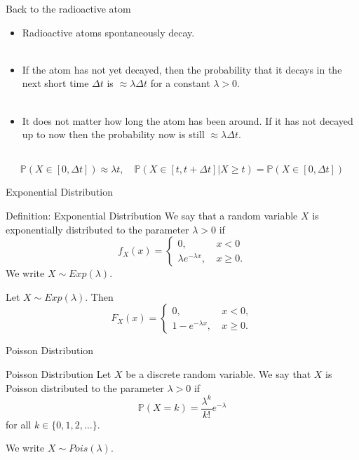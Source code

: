 \documentclass[11pt,pdf,ngerman,UKenglish]{beamer}%
\newcommand{\IP}{\mathbb{P}}
\newcommand{\1}{\mathbb{1}}
\theoremstyle{thm}
\theoremstyle{def}
\begin{document}
\begin{frame}{Back to the radioactive atom}
\begin{itemize}
\item Radioactive atoms spontaneously decay.
\\ \
\item If the atom has not yet decayed, then the probability that it decays in the next short time $\Delta t$ is $\approx \lambda \Delta t$ for a constant $\lambda >0$.
\\ \
\item It does not matter how long the atom has been around. If it has not decayed up to now then the probability now is still $\approx \lambda \Delta t$.
\end{itemize}
\ \\
\pause
$$ \IP( X \in [ 0, \Delta t]) \approx \lambda t
, \quad 
\IP(X \in [t, t + \Delta t] \vert X \geq t ) = \IP( X \in [0,\Delta t])$$
\end{frame}


\begin{frame}{Exponential Distribution}
\begin{block}{Definition: Exponential Distribution}
We say that a random variable $X$ is exponentially distributed to the parameter $\lambda > 0$ if
$$ f_X(x) = \begin{cases} 0, & \ x < 0 \\ \lambda e^{- \lambda x}, & \ x \geq 0. \end{cases}$$
We write $X \sim Exp(\lambda)$.
\end{block}
\pause
\begin{corollary}
Let $X \sim Exp(\lambda)$. Then
$$ F_X(x) = \begin{cases} 0, & \ x <0, \\ 1- e^{-\lambda x}, & \ x \geq 0. \end{cases}$$
\end{corollary}
\end{frame}


\begin{frame}{Poisson Distribution}
\begin{block}{Poisson Distribution}
Let $X$ be a discrete random variable. We say that $X$ is Poisson distributed to the parameter $\lambda >0$ if
$$ \IP( X = k) = \frac{\lambda^k}{k!} e^{-\lambda}$$
for all $k \in \{ 0, 1, 2, \ldots \}$.

We write $X \sim Pois(\lambda)$.
\end{block}
\end{frame}


%
\end{document}
